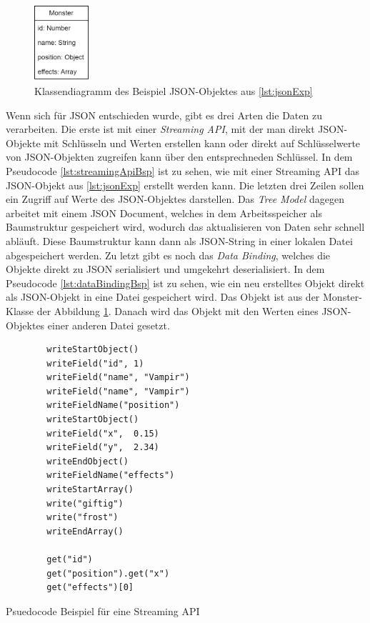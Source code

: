 \begin{figure}[htp]
    \centering
    \includegraphics[width=0.18\textwidth]{images/MonsterBspKlasse.png}
    \caption{Klassendiagramm des Beispiel JSON-Objektes aus \ref{lst:jsonExp}}
    \label{fig:monsterBspKlasse}
\end{figure}

Wenn sich für JSON entschieden wurde, gibt es drei Arten die Daten zu verarbeiten. Die erste ist mit einer \textit{Streaming API}, mit der man direkt JSON-Objekte mit Schlüsseln und Werten erstellen kann oder direkt auf Schlüsselwerte von JSON-Objekten zugreifen kann über den entsprechneden Schlüssel. In dem Pseudocode \ref{lst:streamingApiBsp} ist zu sehen, wie mit einer Streaming API das JSON-Objekt aus \ref{lst:jsonExp} erstellt werden kann. Die letzten drei Zeilen sollen ein Zugriff auf Werte des JSON-Objektes darstellen.\cite{tutorialspointJacksonStreaming} Das \textit{Tree Model} dagegen arbeitet mit einem JSON Document, welches in dem Arbeitsspeicher als Baumstruktur gespeichert wird, wodurch das aktualisieren von Daten sehr schnell abläuft. Diese Baumstruktur kann dann als JSON-String in einer lokalen Datei abgespeichert werden. Zu letzt gibt es noch das \textit{Data Binding}, welches die Objekte direkt zu JSON serialisiert und umgekehrt deserialisiert. In dem Pseudocode \ref{lst:dataBindingBsp} ist zu sehen, wie ein neu erstelltes Objekt direkt als JSON-Objekt in eine Datei gespeichert wird. Das Objekt ist aus der Monster-Klasse der Abbildung \ref{fig:monsterBspKlasse}. Danach wird das Objekt mit den Werten eines JSON-Objektes einer anderen Datei gesetzt.\cite{tutorialspointJacksonData}\cite{tutorialspointJacksonOverview}

\begin{listing}[htp]
    \begin{verbatim} 
        writeStartObject()
        writeField("id", 1)
        writeField("name", "Vampir")
        writeField("name", "Vampir")
        writeFieldName("position")
        writeStartObject()
        writeField("x",  0.15) 
        writeField("y",  2.34) 
        writeEndObject()
        writeFieldName("effects")
        writeStartArray()
        write("giftig") 
        write("frost")
        writeEndArray()

        get("id")
        get("position").get("x")
        get("effects")[0]
    \end{verbatim}
    \caption{Psuedocode Beispiel für eine Streaming API}
    \label{lst:streamingApiBsp}
\end{listing}

